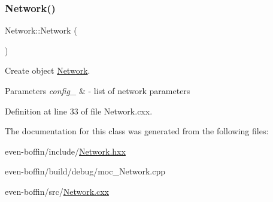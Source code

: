 \subsubsection{\texorpdfstring{Network()}{Network()}}
{\footnotesize\ttfamily Network\+::\+Network (\begin{DoxyParamCaption}{ }\end{DoxyParamCaption})\hspace{0.3cm}{\ttfamily [explicit]}}



Create object \mbox{\hyperlink{classeven_1_1_network}{Network}}. 


\begin{DoxyParams}{Parameters}
{\em config\+\_\+} & -\/ list of network parameters \\
\hline
\end{DoxyParams}


Definition at line 33 of file Network.\+cxx.



The documentation for this class was generated from the following files\+:\begin{DoxyCompactItemize}
\item 
even-\/boffin/include/\mbox{\hyperlink{_network_8hxx}{Network.\+hxx}}\item 
even-\/boffin/build/debug/moc\+\_\+\+Network.\+cpp\item 
even-\/boffin/src/\mbox{\hyperlink{_network_8cxx}{Network.\+cxx}}\end{DoxyCompactItemize}
